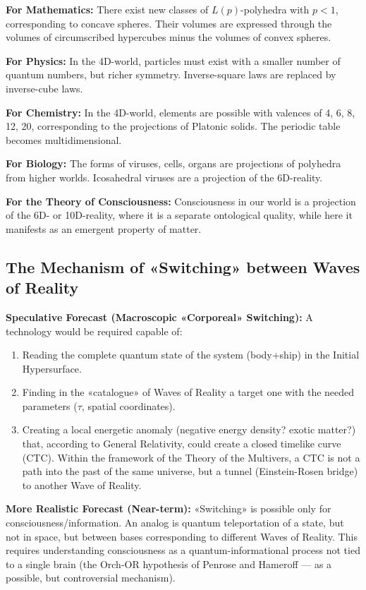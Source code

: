 \documentclass[a4paper,12pt]{article}
\begin{document}
	\textbf{For Mathematics:} There exist new classes of $L(p)$-polyhedra with $p < 1$, corresponding to concave spheres. Their volumes are expressed through the volumes of circumscribed hypercubes minus the volumes of convex spheres.
	
	\textbf{For Physics:} In the 4D-world, particles must exist with a smaller number of quantum numbers, but richer symmetry. Inverse-square laws are replaced by inverse-cube laws.
	
	\textbf{For Chemistry:} In the 4D-world, elements are possible with valences of 4, 6, 8, 12, 20, corresponding to the projections of Platonic solids. The periodic table becomes multidimensional.
	
	\textbf{For Biology:} The forms of viruses, cells, organs are projections of polyhedra from higher worlds. Icosahedral viruses are a projection of the 6D-reality.
	
	\textbf{For the Theory of Consciousness:} Consciousness in our world is a projection of the 6D- or 10D-reality, where it is a separate ontological quality, while here it manifests as an emergent property of matter.
	
	\subsection{The Mechanism of «Switching» between Waves of Reality}
	
	\textbf{Speculative Forecast (Macroscopic «Corporeal» Switching):} A technology would be required capable of:
	\begin{enumerate}
		\item Reading the complete quantum state of the system (body+ship) in the Initial Hypersurface.
		\item Finding in the «catalogue» of Waves of Reality a target one with the needed parameters ($\tau$, spatial coordinates).
		\item Creating a local energetic anomaly (negative energy density? exotic matter?) that, according to General Relativity, could create a closed timelike curve (CTC). Within the framework of the Theory of the Multivers, a CTC is not a path into the past of the same universe, but a tunnel (Einstein-Rosen bridge) to another Wave of Reality.
	\end{enumerate}
	
	\textbf{More Realistic Forecast (Near-term):} «Switching» is possible only for consciousness/information. An analog is quantum teleportation of a state, but not in space, but between bases corresponding to different Waves of Reality. This requires understanding consciousness as a quantum-informational process not tied to a single brain (the Orch-OR hypothesis of Penrose and Hameroff — as a possible, but controversial mechanism).
	
\end{document}
